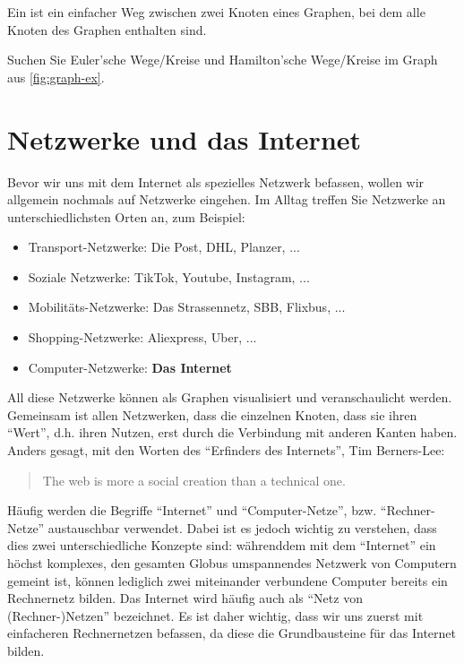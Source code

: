 Ein  ist ein einfacher Weg zwischen zwei Knoten eines Graphen, bei dem alle Knoten des Graphen enthalten sind.

\begin{myexercise}
Suchen Sie Euler'sche Wege/Kreise und Hamilton'sche Wege/Kreise im Graph aus \cref{fig:graph-ex}.
\end{myexercise}
   

\section{Netzwerke und das Internet}
Bevor wir uns mit dem Internet als spezielles Netzwerk befassen, wollen wir allgemein nochmals auf Netzwerke eingehen. Im Alltag treffen Sie Netzwerke an unterschiedlichsten Orten an, zum Beispiel:
\begin{itemize}
\item Transport-Netzwerke: Die Post, DHL, Planzer, ...
\item Soziale Netzwerke: TikTok, Youtube, Instagram, ...
\item Mobilitäts-Netzwerke: Das Strassennetz, SBB, Flixbus, ...
\item Shopping-Netzwerke: Aliexpress, Uber, ...
\item Computer-Netzwerke: \textbf{Das Internet}
\end{itemize}

All diese Netzwerke können als Graphen visualisiert und veranschaulicht werden. Gemeinsam ist allen Netzwerken, dass die einzelnen Knoten, dass sie ihren ``Wert'', d.h. ihren Nutzen, erst durch die Verbindung mit anderen Kanten haben. Anders gesagt, mit den Worten des ``Erfinders des Internets'', Tim Berners-Lee:

\begin{quotation}
The web is more a social creation than a technical one.
\end{quotation}

Häufig werden die Begriffe ``Internet'' und ``Computer-Netze'', bzw. ``Rechner-Netze'' austauschbar verwendet. Dabei ist es jedoch wichtig zu verstehen, dass dies zwei unterschiedliche Konzepte sind: währenddem mit dem ``Internet'' ein höchst komplexes, den gesamten Globus umspannendes Netzwerk von Computern gemeint ist, können lediglich zwei miteinander verbundene Computer bereits ein Rechnernetz bilden. Das Internet wird häufig auch als ``Netz von (Rechner-)Netzen'' bezeichnet. Es ist daher wichtig, dass wir uns zuerst mit einfacheren Rechnernetzen befassen, da diese die Grundbausteine für das Internet bilden.

